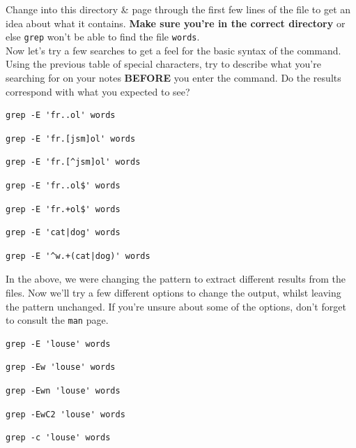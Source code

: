 \documentclass[a4paper,12pt,twoside]{memoir}
\begin{document}
\begin{steps}
Change into this directory \& page through the first few lines of the file to get an idea about what it contains. 
\textbf{Make sure you're in the correct directory} or else \texttt{grep} won't be able to find the file \texttt{words}. \\

Now let's try a few searches to get a feel for the basic syntax of the command.
Using the previous table of special characters, try to describe what you're searching for on your notes \textbf{BEFORE} you enter the command.
Do the results correspond with what you expected to see?

\begin{lstlisting}
grep -E 'fr..ol' words
\end{lstlisting}
\begin{lstlisting}
grep -E 'fr.[jsm]ol' words
\end{lstlisting}
\begin{lstlisting}
grep -E 'fr.[^jsm]ol' words
\end{lstlisting}
\begin{lstlisting}
grep -E 'fr..ol$' words
\end{lstlisting}
\begin{lstlisting}
grep -E 'fr.+ol$' words
\end{lstlisting}
\begin{lstlisting}
grep -E 'cat|dog' words
\end{lstlisting}
\begin{lstlisting}
grep -E '^w.+(cat|dog)' words
\end{lstlisting}
\end{steps}

\begin{steps}
In the above, we were changing the pattern to extract different results from the files.
Now we'll try a few different options to change the output, whilst leaving the pattern unchanged.
If you're unsure about some of the options, don't forget to consult the \texttt{man} page. \\
\begin{lstlisting}
grep -E 'louse' words
\end{lstlisting}
\begin{lstlisting}
grep -Ew 'louse' words
\end{lstlisting}
\begin{lstlisting}
grep -Ewn 'louse' words
\end{lstlisting}
\begin{lstlisting}
grep -EwC2 'louse' words
\end{lstlisting}
\begin{lstlisting}
grep -c 'louse' words
\end{lstlisting}
\end{steps}
\end{document}
